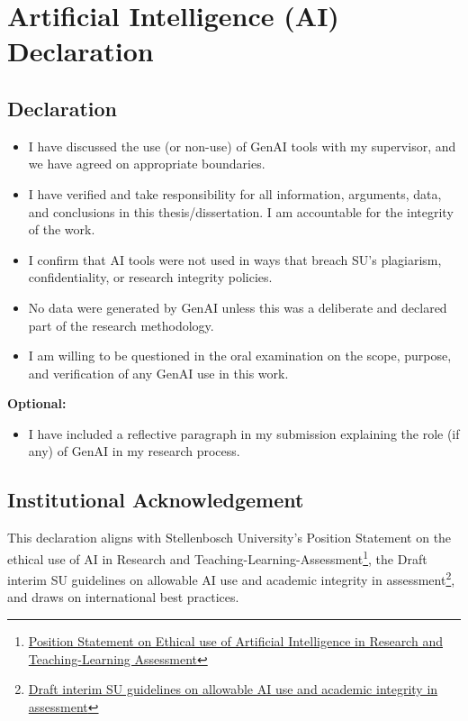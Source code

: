 \chapter*{Artificial Intelligence (AI) Declaration}


\section*{Declaration}

\noindent
\begin{itemize}
    \item I have discussed the use (or non-use) of GenAI tools with my supervisor, and we have agreed on appropriate boundaries.
    \item I have verified and take responsibility for all information, arguments, data, and conclusions in this thesis/dissertation. I am accountable for the integrity of the work.
    \item I confirm that AI tools were not used in ways that breach SU's plagiarism, confidentiality, or research integrity policies.
    \item No data were generated by GenAI unless this was a deliberate and declared part of the research methodology.
    \item I am willing to be questioned in the oral examination on the scope, purpose, and verification of any GenAI use in this work.
\end{itemize}

\noindent\textbf{Optional:}
\begin{itemize}
    \item I have included a reflective paragraph in my submission explaining the role (if any) of GenAI in my research process.
\end{itemize}

\section*{Institutional Acknowledgement}


\noindent
This declaration aligns with Stellenbosch University's Position Statement on the ethical use of AI in Research and Teaching-Learning-Assessment\footnote{\href{https://files.su.ac.za/public/stellenbosch-university/documents/2025-09/position-statement-ethical-use-artificial-intelligence-research-and-teaching-learning-assessment.pdf}{Position Statement on Ethical use of Artificial Intelligence in Research and Teaching-Learning Assessment}}, the Draft interim SU guidelines on allowable AI use and academic integrity in assessment\footnote{\href{https://libguides.sun.ac.za/ld.php?content_id=79729948}{Draft interim SU guidelines on allowable AI use and academic integrity in assessment}}, and draws on international best practices.